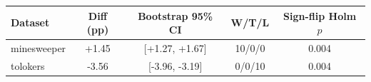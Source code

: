 \begin{tabular}{lcccc}
\toprule
Dataset & Diff (pp) & Bootstrap 95\% CI & W/T/L & Sign-flip Holm $p$ \\
\midrule
minesweeper & +1.45 & [+1.27, +1.67] & 10/0/0 & 0.004 \\
tolokers & -3.56 & [-3.96, -3.19] & 0/0/10 & 0.004 \\
\bottomrule
\end{tabular}
